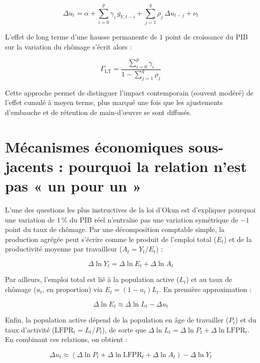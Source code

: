 \documentclass[11pt,a4paper]{article}
\begin{document}
\begin{equation}
\Delta u_t = \alpha + \sum_{i=0}^{p} \gamma_i \, g_{Y,t-i} + \sum_{j=1}^{q} \rho_j \, \Delta u_{t-j} + \nu_t
\end{equation}

L'effet de long terme d'une hausse permanente de $1$ point de croissance du PIB sur la variation du chômage s'écrit alors :

\begin{equation}
\Gamma_{\text{LT}} = \frac{\sum_{i=0}^{p} \gamma_i}{1 - \sum_{j=1}^{q} \rho_j}
\end{equation}

Cette approche permet de distinguer l'impact contemporain (souvent modéré) de l'effet cumulé à moyen terme, plus marqué une fois que les ajustements d'embauche et de rétention de main-d'œuvre se sont diffusés.

\section{Mécanismes économiques sous-jacents : pourquoi la relation n'est pas « un pour un »}

L'une des questions les plus instructives de la loi d'Okun est d'expliquer pourquoi une variation de $1\,\%$ du PIB réel n'entraîne pas une variation symétrique de $-1$ point du taux de chômage. Par une décomposition comptable simple, la production agrégée peut s'écrire comme le produit de l'emploi total ($E_t$) et de la productivité moyenne par travailleur ($A_t = Y_t / E_t$) :

\begin{equation}
\Delta \ln Y_t = \Delta \ln E_t + \Delta \ln A_t
\end{equation}

Par ailleurs, l'emploi total est lié à la population active ($L_t$) et au taux de chômage ($u_t$, en proportion) via $E_t = (1 - u_t) L_t$. En première approximation :

\begin{equation}
\Delta \ln E_t \approx \Delta \ln L_t - \Delta u_t
\end{equation}

Enfin, la population active dépend de la population en âge de travailler ($P_t$) et du taux d'activité ($\text{LFPR}_t = L_t / P_t$), de sorte que $\Delta \ln L_t = \Delta \ln P_t + \Delta \ln \text{LFPR}_t$. En combinant ces relations, on obtient :

\begin{equation}
\Delta u_t \approx \left( \Delta \ln P_t + \Delta \ln \text{LFPR}_t + \Delta \ln A_t \right) - \Delta \ln Y_t
\end{equation}
\end{document}
